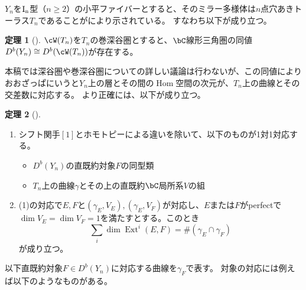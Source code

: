 \documentclass[uplatex,11pt,a4paper,dvipdfmx]{jsarticle}
\numberwithin{equation}{section}
\theoremstyle{definition}
\newtheorem{theorem}{定理}[section]
\DeclareMathOperator{\Hom}{\mathrm{Hom}}
\DeclareMathOperator{\Ext}{\mathrm{Ext}}
\begin{document}
$Y_n$を$\rm{I}_n$型（$n \geq 2$）の小平ファイバーとすると、そのミラー多様体は$n$点穴あきトーラス$T_n$であることが\cite{MR3663596}により示されている。
すなわち以下が成り立つ。
\begin{theorem}[\cite{MR3663596}]
    $\cW(T_n)$を$T_n$の巻深谷圏とすると、$\bC$線形三角圏の同値$D^b(Y_n) \cong D^b(\cW(T_n))$が存在する。
\end{theorem}

本稿では深谷圏や巻深谷圏についての詳しい議論は行わないが、この同値によりおおざっぱにいうと$Y_n$上の層とその間の$\Hom$空間の次元が、$T_n$上の曲線とその交差数に対応する。
より正確には、以下が成り立つ。
\begin{theorem}[\cite{2020arXiv201108288O}]
    \begin{enumerate}
        \item シフト関手$[1]$とホモトピーによる違いを除いて、以下のものが1対1対応する。\begin{itemize}
                  \item $D^b(Y_n)$の直既約対象$F$の同型類
                  \item $T_n$上の曲線$\gamma$とその上の直既約$\bC$局所系$V$の組
              \end{itemize}
        \item (1)の対応で$E,F$と$(\gamma_E, V_E), (\gamma_E, V_F)$が対応し、$E$または$F$がperfectで$\dim V_E = \dim V_F = 1$を満たすとする。このとき\begin{equation}
                  \sum_{i}\dim\Ext^i(E, F) = \#(\gamma_E \cap \gamma_F)
              \end{equation}が成り立つ。
    \end{enumerate}
\end{theorem}
以下直既約対象$F \in D^b(Y_n)$に対応する曲線を$\gamma_F$で表す。
対象の対応には例えば以下のようなものがある。
\end{document}
